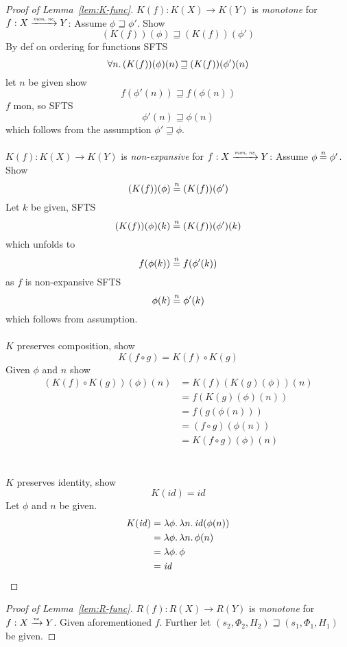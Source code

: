 \documentclass[a4paper]{article}
\newcommand{\monnefun}{\xrightarrow{\textit{\tiny{mon, ne}}}}
\newcommand{\nefun}{\xrightarrow{\textit{\tiny{ne}}}}
\newcommand{\nequal}[1][n]{\stackrel{\tiny{#1}}{=}}
\newcommand{\id}{\var{id}}
\newcommand{\var}[1]{\mathit{#1}}
\newcommand{\future}{\mathbin{\sqsupseteq}}
\begin{document}
\begin{appendices}
\begin{proof}[Proof of Lemma~\ref{lem:K-func}]
  $K(f) : K(X) \rightarrow K(Y)$ is \emph{monotone} for $f : X \monnefun Y$:
  Assume $\phi \future \phi'$. Show
  \[
    (K(f))(\phi) \future (K(f))(\phi') 
  \]
  By def on ordering for functions SFTS
  \[
    \forall n \ldotp (K(f))(\phi)(n) \future (K(f))(\phi')(n)
  \]
  let $n$ be given show
  \[
    f(\phi'(n)) \future f(\phi(n))
  \]
  $f$ mon, so SFTS
  \[
    \phi'(n) \future \phi(n)
  \]
  which follows from the assumption $\phi' \future \phi$.\\\\
  $K(f) : K(X) \rightarrow K(Y)$ is \emph{non-expansive} for $f : X \monnefun Y$:
  Assume $\phi \nequal \phi'$. Show
  \[
    (K(f))(\phi) \nequal (K(f))(\phi') 
  \]
  Let $k$ be given, SFTS
  \[
    (K(f))(\phi)(k) \nequal (K(f))(\phi')(k)
  \]
  which unfolds to
  \[
    f(\phi(k)) \nequal f(\phi'(k))
  \]
  as $f$ is non-expansive SFTS
  \[
    \phi(k) \nequal \phi'(k)
  \]
  which follows from assumption.\\\\
  $K$ preserves composition, show
  \[
    K(f \circ g) = K(f) \circ K(g)
  \]
  Given $\phi$ and $n$ show
  \begin{align*}
    (K(f) \circ K(g))(\phi)(n) & = K(f)(K(g)(\phi))(n) \\
                               & = f(K(g)(\phi)(n)) \\
                               & = f(g(\phi(n))) \\
                               & = (f \circ g)(\phi(n)) \\
                               & = K(f \circ g)(\phi)(n)
  \end{align*}\\\\
  $K$ preserves identity, show
  \[
    K(\id) = \id
  \]
  Let $\phi$ and $n$ be given.
  \begin{align*}
    K(\id) & = \lambda \phi \ldotp \lambda n \ldotp \id(\phi(n)) \\
           & = \lambda \phi \ldotp \lambda n \ldotp \phi(n) \\
           & = \lambda \phi \ldotp \phi \\
           & = \id
  \end{align*}
\end{proof}

\begin{proof}[Proof of Lemma~\ref{lem:R-func}]
   $R(f) : R(X) \rightarrow R(Y)$ is \emph{monotone} for $f : X \nefun Y$. Given aforementioned $f$. Further let $(s_2,\Phi_2,H_2) \future (s_1,\Phi_1,H_1)$ be given. 


\end{proof}
\end{appendices}
\end{document}
